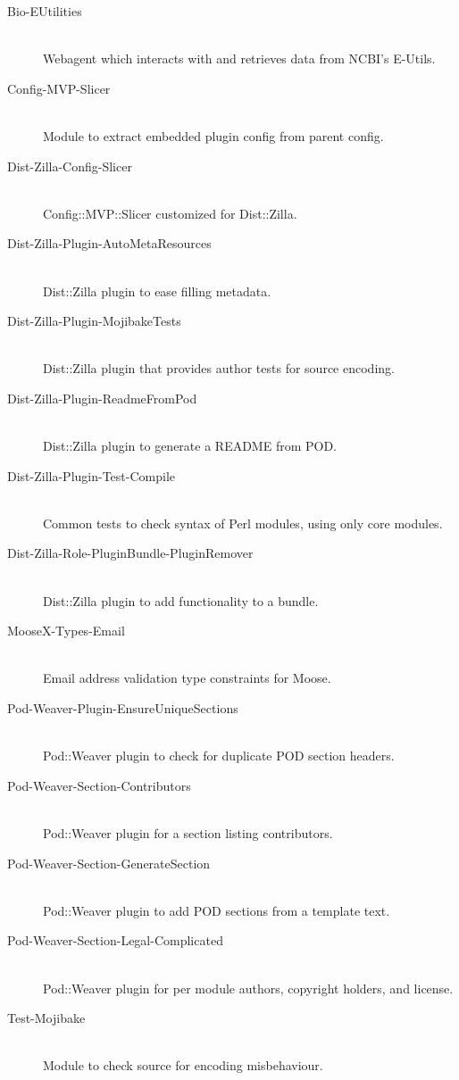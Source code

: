 \begin{table}
  \label{tab:software:debian-packages}
  \begin{description}
  \item[Bio-EUtilities] \hfill \\
    Webagent which interacts with and retrieves data from NCBI's E-Utils.
  \item[Config-MVP-Slicer] \hfill \\
    Module to extract embedded plugin config from parent config.
  \item[Dist-Zilla-Config-Slicer] \hfill \\
    Config::MVP::Slicer customized for Dist::Zilla.
  \item[Dist-Zilla-Plugin-AutoMetaResources] \hfill \\
    Dist::Zilla plugin to ease filling  metadata.
  \item[Dist-Zilla-Plugin-MojibakeTests] \hfill \\
    Dist::Zilla plugin that provides author tests for source encoding.
  \item[Dist-Zilla-Plugin-ReadmeFromPod] \hfill \\
    Dist::Zilla plugin to generate a README from POD.
  \item[Dist-Zilla-Plugin-Test-Compile] \hfill \\
    Common tests to check syntax of Perl modules, using only core modules.
  \item[Dist-Zilla-Role-PluginBundle-PluginRemover] \hfill \\
    Dist::Zilla plugin to add  functionality to a bundle.
  \item[MooseX-Types-Email] \hfill \\
    Email address validation type constraints for Moose.
  \item[Pod-Weaver-Plugin-EnsureUniqueSections] \hfill \\
    Pod::Weaver plugin to check for duplicate POD section headers.
  \item[Pod-Weaver-Section-Contributors] \hfill \\
    Pod::Weaver plugin for a section listing contributors.
  \item[Pod-Weaver-Section-GenerateSection] \hfill \\
    Pod::Weaver plugin to add POD sections from a template text.
  \item[Pod-Weaver-Section-Legal-Complicated] \hfill \\
    Pod::Weaver plugin for per module authors, copyright holders, and license.
  \item[Test-Mojibake] \hfill \\
    Module to check source for encoding misbehaviour.
  \end{description}
\end{table}


